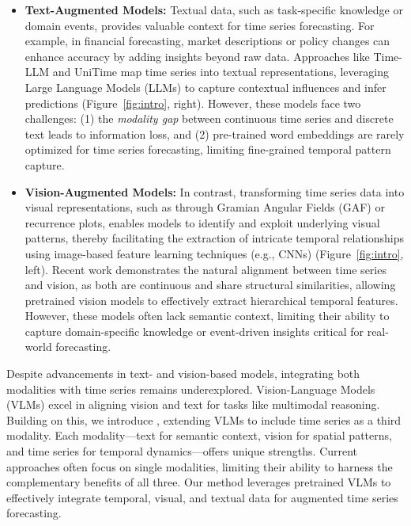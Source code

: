 \begin{itemize}[leftmargin=*, itemsep=0pt]
    \item \textbf{Text-Augmented Models:} Textual data, such as task-specific knowledge or domain events, provides valuable context for time series forecasting. For example, in financial forecasting, market descriptions or policy changes can enhance accuracy by adding insights beyond raw data. Approaches like Time-LLM \cite{jin2023time} and UniTime \cite{liu2024unitime} map time series into textual representations, leveraging Large Language Models (LLMs) to capture contextual influences and infer predictions (Figure~\ref{fig:intro}, right). However, these models face two challenges: (1) the \textit{modality gap} between continuous time series and discrete text leads to information loss, and (2) pre-trained word embeddings are rarely optimized for time series forecasting, limiting fine-grained temporal pattern capture.

    \item \textbf{Vision-Augmented Models:} In contrast, transforming time series data into visual representations, such as through Gramian Angular Fields (GAF) or recurrence plots, enables models to identify and exploit underlying visual patterns, thereby facilitating the extraction of intricate temporal relationships using image-based feature learning techniques (e.g., CNNs) (Figure~\ref{fig:intro}, left). Recent work \cite{wu2023timesnet,wang2024timemixer++,chen2024visiontsvisualmaskedautoencoders} demonstrates the natural alignment between time series and vision, as both are continuous and share structural similarities, allowing pretrained vision models to effectively extract hierarchical temporal features. However, these models often lack semantic context, limiting their ability to capture domain-specific knowledge or event-driven insights critical for real-world forecasting.
\end{itemize}

\vspace{-1em}

Despite advancements in text- and vision-based models, integrating both modalities with time series remains underexplored. Vision-Language Models (VLMs) \cite{radford2021learning} excel in aligning vision and text for tasks like multimodal reasoning. Building on this, we introduce \method, extending VLMs to include time series as a third modality. Each modality—text for semantic context, vision for spatial patterns, and time series for temporal dynamics—offers unique strengths. Current approaches often focus on single modalities, limiting their ability to harness the complementary benefits of all three. Our method leverages pretrained VLMs to effectively integrate temporal, visual, and textual data for augmented time series forecasting.

